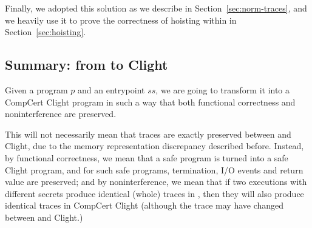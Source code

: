 Finally, we adopted this solution as we describe in
Section~\ref{sec:norm-traces}, and we heavily use it to prove the
correctness of hoisting within \cstar in Section~\ref{sec:hoisting}.

\subsection{Summary: from \cstar to Clight}

Given a \cstar program $p$ and an entrypoint $ss$, we are going to
transform it into a CompCert Clight program in such a way that both
functional correctness and noninterference are preserved.

This will not necessarily mean that traces are exactly preserved
between \cstar and Clight, due to the memory representation discrepancy
described before. Instead, by functional correctness, we mean that a
safe \cstar program is turned into a safe Clight program, and for such
safe programs, termination, I/O events and return value are preserved;
and by noninterference, we mean that if two executions with different
secrets produce identical (whole) traces in \cstar, then they will also
produce identical traces in CompCert Clight (although the trace may
have changed between \cstar and Clight.)


